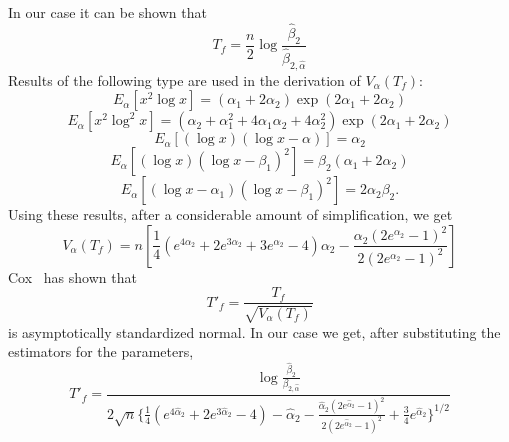 \documentclass[draft]{article}
\begin{document}
In our case it can be shown that
\begin{equation}
T_f=\frac{n}{2}\log\frac{\hat{\beta}_2}{\hat{\beta}_{2,\hat{\alpha}}}
\end{equation}
Results of the following type are used in the derivation of
\(V_\alpha\left(T_f\right)\):
\begin{equation}
E_\alpha\left[x^2\log x\right] =
\left(\alpha_1+2\alpha_2\right)\exp\left(2\alpha_1+2\alpha_2\right)
\end{equation}
\null\begin{equation}
E_\alpha\left[x^2\log^2x\right] =
\left(\alpha_2+\alpha_1^2+4\alpha_1\alpha_2+4\alpha_2^2\right)
\exp\left(2\alpha_1+2\alpha_2\right)
\end{equation}
\null\begin{equation}
E_\alpha\left[\left(\log x\right)\left(\log x-\alpha\right)\right] =
\alpha_2
\end{equation}
\null\begin{equation}
E_\alpha\left[\left(\log x\right)\left(\log x-\beta_1\right)^2\right] =
\beta_2\left(\alpha_1+2\alpha_2\right)
\end{equation}
\null\begin{equation}
E_\alpha\left[\left(\log x -\alpha_1\right)
\left(\log x-\beta_1\right)^2\right] =
2\alpha_2\beta_2.
\end{equation}
Using these results, after a considerable amount of simplification,
we get
\begin{equation}
V_\alpha\left(T_f\right)=n\left[
\frac{1}{4}\left(e^{4\alpha_2}+
2e^{3\alpha_2}+
3e^{\alpha_2}-4\right)
\alpha_2-
\frac{\alpha_2\left(2e^{\alpha_2}-1\right)^2}
     {2\left(2e^{\alpha_2}-1\right)^2}\right]
\end{equation}
Cox~\cite{cox62} has shown that
\begin{equation}
T'_f=\frac{T_f}{\sqrt{V_\alpha\left(T_f\right)}}
\end{equation}
is asymptotically standardized normal. In our case we get,
after substituting the estimators for the parameters,
\begin{equation}
T'_f = \frac{\log\frac{\hat{\beta}_2}{\beta_{2,\hat{\alpha}}}}
{2\sqrt{n}\{\frac{1}{4}\left(e^{4\hat{\alpha}_2}+
2e^{3\hat{\alpha}_2} -4\right) -\hat{\alpha}_2 -
\frac{\hat{\alpha}_2\left(2e^{\hat{\alpha}_2}-1\right)^2}
     {2\left(2e^{\hat{\alpha}_2}-1\right)^2}
+\frac{3}{4}e^{\hat{\alpha}_2}\}^{1/2}}
\end{equation}
\end{document}
